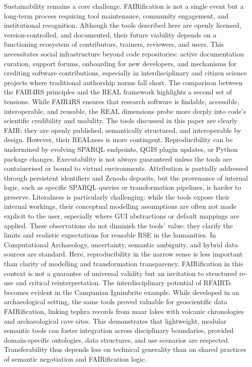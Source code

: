 \documentclass{eceasst}
\begin{document}
Sustainability remains a core challenge. FAIRification is not a single event but a long-term process requiring tool maintenance, community engagement, and institutional recognition. Although the tools described here are openly licensed, version-controlled, and documented, their future viability depends on a functioning ecosystem of contributors, trainers, reviewers, and users. This necessitates social infrastructure beyond code repositories: active documentation curation, support forums, onboarding for new developers, and mechanisms for crediting software contributions, especially in interdisciplinary and citizen science projects where traditional authorship norms fall short. The comparison between the FAIR4RS principles and the REAL framework highlights a second set of tensions. While FAIR4RS ensures that research software is findable, accessible, interoperable, and reusable, the REAL dimensions probe more deeply into code's scientific credibility and usability. The tools discussed in this paper are clearly FAIR: they are openly published, semantically structured, and interoperable by design. However, their REALness is more contingent. Reproducibility can be undermined by evolving SPARQL endpoints, QGIS plugin updates, or Python package changes. Executability is not always guaranteed unless the tools are containerised or bound to virtual environments. Attribution is partially addressed through persistent identifiers and Zenodo deposits, but the provenance of internal logic, such as specific SPARQL queries or transformation pipelines, is harder to preserve. Literalness is particularly challenging: while the tools expose their internal workings, their conceptual modelling assumptions are often not made explicit to the user, especially where GUI abstractions or default mappings are applied. These observations do not diminish the tools’ value; they clarify the limits and realistic expectations for reusable RSE in the humanities. In Computational Archaeology, uncertainty, semantic ambiguity, and hybrid data sources are standard. Here, reproducibility in the narrow sense is less important than clarity of modelling and transformation transparency. FAIRification in this context is not a guarantee of universal validity but an invitation to structured re-use and critical reinterpretation. The interdisciplinary potential of RFAIRTs becomes evident in the Campanian Ignimbrite example. While developed in an archaeological setting, the same tools proved valuable for geoscientific data FAIRification, linking tephra records from maar lakes with volcanic chronologies and archaeological cave sites. This demonstrates that lightweight, modular semantic tools can foster integration across disciplinary boundaries, provided domain-specific ontologies, data structures, and use scenarios are respected. Transferability thus depends less on technical generality than on shared practices of semantic negotiation and FAIRification logic.
\end{document}

